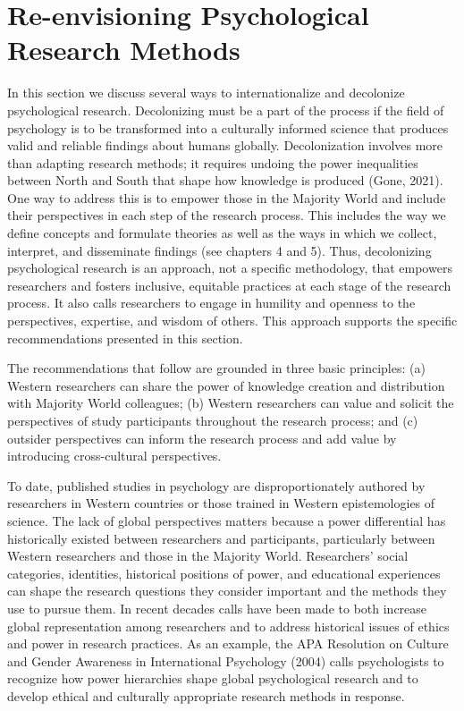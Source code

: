 \documentclass[
  11pt,
]{book}
\begin{document}
\section{Re-envisioning Psychological Research Methods}\label{re-envisioning-psychological-research-methods}

In this section we discuss several ways to internationalize and decolonize psychological research. Decolonizing must be a part of the process if the field of psychology is to be transformed into a culturally informed science that produces valid and reliable findings about humans globally. Decolonization involves more than adapting research methods; it requires undoing the power inequalities between North and South that shape how knowledge is produced (Gone, 2021). One way to address this is to empower those in the Majority World and include their perspectives in each step of the research process. This includes the way we define concepts and formulate theories as well as the ways in which we collect, interpret, and disseminate findings (see chapters 4 and 5). Thus, decolonizing psychological research is an approach, not a specific methodology, that empowers researchers and fosters inclusive, equitable practices at each stage of the research process. It also calls researchers to engage in humility and openness to the perspectives, expertise, and wisdom of others. This approach supports the specific recommendations presented in this section.

The recommendations that follow are grounded in three basic principles: (a) Western researchers can share the power of knowledge creation and distribution with Majority World colleagues; (b) Western researchers can value and solicit the perspectives of study participants throughout the research process; and (c) outsider perspectives can inform the research process and add value by introducing cross-cultural perspectives.

To date, published studies in psychology are disproportionately authored by researchers in Western countries or those trained in Western epistemologies of science. The lack of global perspectives matters because a power differential has historically existed between researchers and participants, particularly between Western researchers and those in the Majority World. Researchers' social categories, identities, historical positions of power, and educational experiences can shape the research questions they consider important and the methods they use to pursue them. In recent decades calls have been made to both increase global representation among researchers and to address historical issues of ethics and power in research practices. As an example, the APA Resolution on Culture and Gender Awareness in International Psychology (2004) calls psychologists to recognize how power hierarchies shape global psychological research and to develop ethical and culturally appropriate research methods in response.
\end{document}
